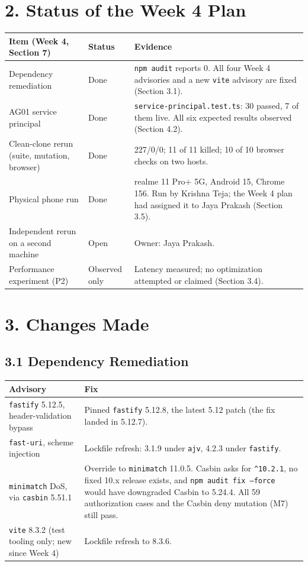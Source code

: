 \documentclass{article}
\begin{document}
\section*{2. Status of the Week 4 Plan}
\begin{tabularx}{\textwidth}{@{}l l Y@{}}
\toprule
\textbf{Item (Week 4, Section 7)} & \textbf{Status} & \textbf{Evidence} \\
\midrule
Dependency remediation & Done & \texttt{npm audit} reports 0. All four Week 4 advisories and a new \texttt{vite} advisory are fixed (Section 3.1). \\
AG01 service principal & Done & \texttt{service-principal.test.ts}: 30 passed, 7 of them live. All six expected results observed (Section 4.2). \\
Clean-clone rerun (suite, mutation, browser) & Done & 227/0/0; 11 of 11 killed; 10 of 10 browser checks on two hosts. \\
Physical phone run & Done & realme 11 Pro+ 5G, Android 15, Chrome 156. Run by Krishna Teja; the Week 4 plan had assigned it to Jaya Prakash (Section 3.5). \\
Independent rerun on a second machine & Open & Owner: Jaya Prakash. \\
Performance experiment (P2) & Observed only & Latency measured; no optimization attempted or claimed (Section 3.4). \\
\bottomrule
\end{tabularx}

\section*{3. Changes Made}
\subsection*{3.1 Dependency Remediation}
\begin{tabularx}{\textwidth}{@{}l Y@{}}
\toprule
\textbf{Advisory} & \textbf{Fix} \\
\midrule
\texttt{fastify} 5.12.5, header-validation bypass & Pinned \texttt{fastify} 5.12.8, the latest 5.12 patch (the fix landed in 5.12.7). \\
\texttt{fast-uri}, scheme injection & Lockfile refresh: 3.1.9 under \texttt{ajv}, 4.2.3 under \texttt{fastify}. \\
\texttt{minimatch} DoS, via \texttt{casbin} 5.51.1 & Override to \texttt{minimatch} 11.0.5. Casbin asks for \texttt{\^{}10.2.1}, no fixed 10.x release exists, and \texttt{npm audit fix --force} would have downgraded Casbin to 5.24.4. All 59 authorization cases and the Casbin deny mutation (M7) still pass. \\
\texttt{vite} 8.3.2 (test tooling only; new since Week 4) & Lockfile refresh to 8.3.6. \\
\bottomrule
\end{tabularx}
\end{document}
